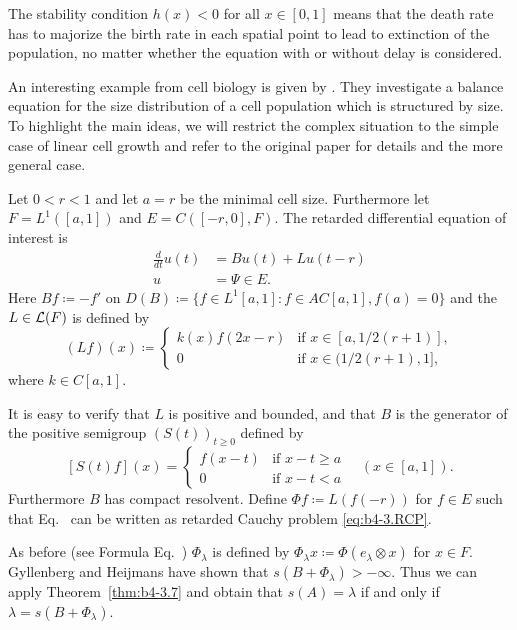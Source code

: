 	The stability condition $h(x) < 0$ for all $x \in [0,1]$ means that the death rate has to majorize the birth rate in each spatial point to lead to extinction of the population, no matter whether the equation with or without delay is considered.
\begin{example}\label{ex:b4-3.12}
	An interesting example from cell biology is given by \textcite{gyllenbergheijmans:1987}. 
	They investigate a balance equation for the size distribution of a cell population which is structured by size. 
	To highlight the main ideas, we will restrict the complex situation to the simple case of linear cell growth and refer to the original paper for details and the more general case.
	
    Let $0 < r < 1$ and let $a = r$ be the minimal cell size. 
    Furthermore let $F = L^1([a,1])$ and $E = C([-r,0],F)$. 
    The retarded differential equation of interest is 
    \begin{equation}\label{eq:b4-3.12}
            \begin{aligned}
        \frac{d}{dt}u(t) &= Bu(t) + Lu(t-r)\\
        u &= \Psi \in E.
        \end{aligned}
    \end{equation}
Here $Bf  \coloneq  -f'$ on $D(B) \coloneq \{f \in L^1[a,1] \colon f \in AC[a,1], f(a) = 0\}$ and the $L \in \mathcal{L}(F) $ is defined by
\[
(Lf)(x) \coloneq 
\begin{cases}
	k(x)f(2x-r) & \text{if } x \in [a,1/2(r+1)] , \\
	0 & \text{if } x \in (1/2(r+1),1] ,
\end{cases}
\]
where $k \in C[a,1]$.

It is easy to verify that $L$ is positive and bounded, and that $B$ is the generator of the positive semigroup $(S(t))_{t\geq0}$ defined by
\[
[S(t)f](x) = 
\begin{cases}
	f(x-t) & \text{if } x-t \geq a \\
	0 & \text{if } x-t < a
\end{cases}
\quad (x \in [a,1]).
\]
Furthermore $B$ has compact resolvent. 
Define $\Phi f  \coloneq  L(f(-r))$ for $f \in E$ such that Eq.~ can be written as retarded Cauchy problem \eqref{eq:b4-3.RCP}.

As before (see Formula Eq.~) $\Phi_{\lambda}$ is defined by $\Phi_{\lambda}x  \coloneq  \Phi(e_{\lambda}\otimes x)$ for $x \in F$. 
Gyllenberg and Heijmans have shown that $s(B + \Phi_{\lambda}) > -\infty$. 
Thus we can apply Theorem~\ref{thm:b4-3.7} and obtain that $s(A) = \lambda$ if and only if\/ $\lambda = s(B + \Phi_{\lambda})$.
\end{example}
